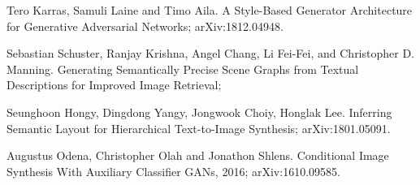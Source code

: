 \documentclass{article}
\begin{document}
\begin{thebibliography}{1}
Tero Karras, Samuli Laine and Timo Aila.
\newblock A Style-Based Generator Architecture for Generative Adversarial Networks;
\newblock arXiv:1812.04948.

Sebastian Schuster, Ranjay Krishna, Angel Chang,
Li Fei-Fei, and Christopher D. Manning.
\newblock Generating Semantically Precise Scene Graphs from Textual Descriptions for Improved Image Retrieval;

Seunghoon Hongy, Dingdong Yangy, Jongwook Choiy, Honglak Lee.
\newblock Inferring Semantic Layout for Hierarchical Text-to-Image Synthesis;
\newblock arXiv:1801.05091.

Augustus Odena, Christopher Olah and Jonathon Shlens.
\newblock Conditional Image Synthesis With Auxiliary Classifier GANs, 2016;
\newblock arXiv:1610.09585.


\end{thebibliography}

% 
\end{document}
